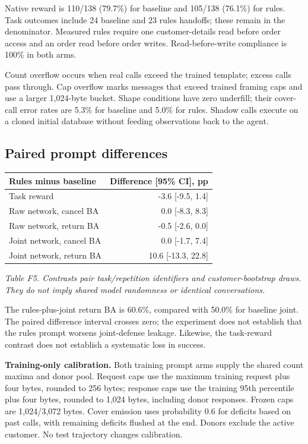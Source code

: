 \documentclass[10pt,letterpaper]{article}
\begin{document}
Native reward is 110/138 (79.7\%) for baseline and 105/138 (76.1\%) for rules. Task outcomes include 24 baseline and 23 rules handoffs; these remain in the denominator. Measured rules require one customer-details read before order access and an order read before order writes. Read-before-write compliance is 100\% in both arms.

Count overflow occurs when real calls exceed the trained template; excess calls pass through. Cap overflow marks messages that exceed trained framing caps and use a larger 1,024-byte bucket. Shape conditions have zero underfill; their cover-call error rates are 5.3\% for baseline and 5.0\% for rules. Shadow calls execute on a cloned initial database without feeding observations back to the agent.

\subsection*{Paired prompt differences}

\begin{center}\small
\begin{tabular}{@{}lr@{}}\toprule
Rules minus baseline & Difference [95\% CI], pp\\\midrule
Task reward & -3.6 [-9.5, 1.4]\\
Raw network, cancel BA & 0.0 [-8.3, 8.3]\\
Raw network, return BA & -0.5 [-2.6, 0.0]\\
Joint network, cancel BA & 0.0 [-1.7, 7.4]\\
Joint network, return BA & 10.6 [-13.3, 22.8]\\
\bottomrule\end{tabular}
\end{center}
\noindent\textit{Table F5. Contrasts pair task/repetition identifiers and customer-bootstrap draws. They do not imply shared model randomness or identical conversations.}
\par\medskip

The rules-plus-joint return BA is 60.6\%, compared with 50.0\% for baseline joint. The paired difference interval crosses zero; the experiment does not establish that the rules prompt worsens joint-defense leakage. Likewise, the task-reward contrast does not establish a systematic loss in success.

\textbf{Training-only calibration.} Both training prompt arms supply the shared count maxima and donor pool. Request caps use the maximum training request plus four bytes, rounded to 256 bytes; response caps use the training 95th percentile plus four bytes, rounded to 1,024 bytes, including donor responses. Frozen caps are 1,024/3,072 bytes. Cover emission uses probability 0.6 for deficits based on past calls, with remaining deficits flushed at the end. Donors exclude the active customer. No test trajectory changes calibration.
\end{document}
